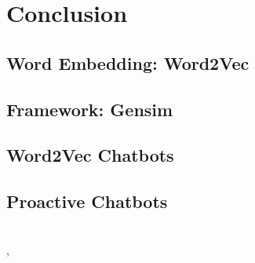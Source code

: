 \chapter{Conclusion}
\label{chap:conclusion}

\section{Word Embedding: Word2Vec}

\section{Framework: Gensim}

\section{Word2Vec Chatbots}

\section{Proactive Chatbots}





~\\[1cm]
\Locality, \Date
~\\[1cm]
\Author